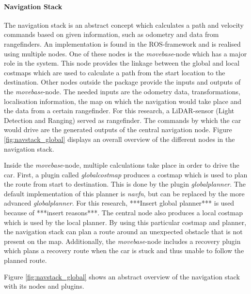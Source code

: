 \documentclass[conference,a4paper]{IEEEtran}
\begin{document}
\paragraph{Navigation Stack}
The navigation stack is an abstract concept which calculates a path and velocity commands based on given information, such as odometry and data from rangefinders. An implementation is found in the ROS-framework and is realised using multiple nodes. One of these nodes is the \emph{move\textunderscore base}-node which has a major role in the system. This node provides the linkage between the global and local costmaps which are used to calculate a path from the start location to the destination. Other nodes outside the package provide the inputs and outputs of the \emph{move\textunderscore base}-node. The needed inputs are the odometry data, transformations, localisation information, the map on which the navigation would take place and the data from a certain rangefinder. For this research, a LiDAR-sensor (Light Detection and Ranging) served as rangefinder. The commands by which the car would drive are the generated outputs of the central navigation node. Figure \ref{fig:navstack_global} displays an overall overview of the different nodes in the navigation stack. \cite{Marder-Eppstein2016}

Inside the \textit{move\textunderscore base}-node, multiple calculations take place in order to drive the car. First, a plugin called \emph{global\textunderscore costmap} produces a costmap which is used to plan the route from start to destination. This is done by the plugin \emph{global\textunderscore planner}. The default implementation of this planner is \emph{navfn}, but can be replaced by the more advanced \emph{global\textunderscore planner}. For this research, ***Insert global planner*** is used because of ***insert reasons***. The central node also produces a local costmap which is used by the local planner. By using this particular costmap and planner, the navigation stack can plan a route around an unexpected obstacle that is not present on the map. Additionally, the \emph{move\textunderscore base}-node includes a recovery plugin which plans a recovery route when the car is stuck and thus unable to follow the planned route. \cite{Marder-Eppstein2016_2, Zheng2016}

Figure \ref{fig:navstack_global} shows an abstract overview of the navigation stack with its nodes and plugins. \\
\end{document}
